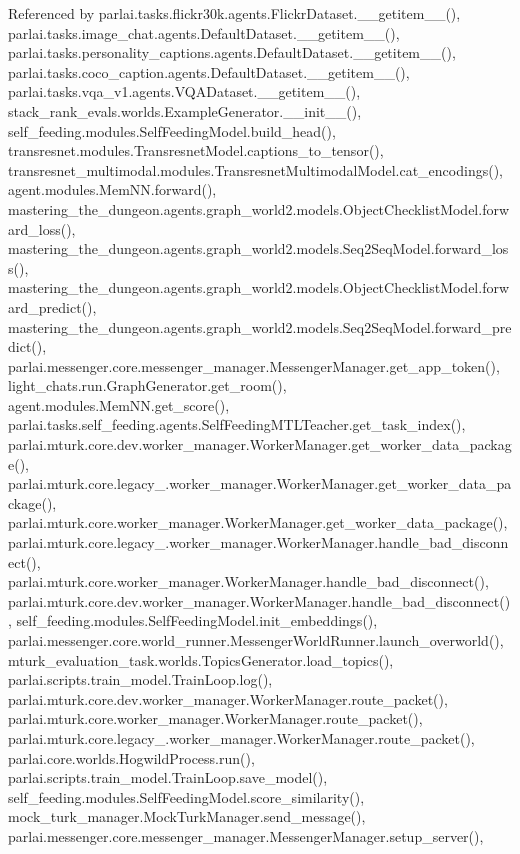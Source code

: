 Referenced by parlai.\+tasks.\+flickr30k.\+agents.\+Flickr\+Dataset.\+\_\+\+\_\+getitem\+\_\+\+\_\+(), parlai.\+tasks.\+image\+\_\+chat.\+agents.\+Default\+Dataset.\+\_\+\+\_\+getitem\+\_\+\+\_\+(), parlai.\+tasks.\+personality\+\_\+captions.\+agents.\+Default\+Dataset.\+\_\+\+\_\+getitem\+\_\+\+\_\+(), parlai.\+tasks.\+coco\+\_\+caption.\+agents.\+Default\+Dataset.\+\_\+\+\_\+getitem\+\_\+\+\_\+(), parlai.\+tasks.\+vqa\+\_\+v1.\+agents.\+V\+Q\+A\+Dataset.\+\_\+\+\_\+getitem\+\_\+\+\_\+(), stack\+\_\+rank\+\_\+evals.\+worlds.\+Example\+Generator.\+\_\+\+\_\+init\+\_\+\+\_\+(), self\+\_\+feeding.\+modules.\+Self\+Feeding\+Model.\+build\+\_\+head(), transresnet.\+modules.\+Transresnet\+Model.\+captions\+\_\+to\+\_\+tensor(), transresnet\+\_\+multimodal.\+modules.\+Transresnet\+Multimodal\+Model.\+cat\+\_\+encodings(), agent.\+modules.\+Mem\+N\+N.\+forward(), mastering\+\_\+the\+\_\+dungeon.\+agents.\+graph\+\_\+world2.\+models.\+Object\+Checklist\+Model.\+forward\+\_\+loss(), mastering\+\_\+the\+\_\+dungeon.\+agents.\+graph\+\_\+world2.\+models.\+Seq2\+Seq\+Model.\+forward\+\_\+loss(), mastering\+\_\+the\+\_\+dungeon.\+agents.\+graph\+\_\+world2.\+models.\+Object\+Checklist\+Model.\+forward\+\_\+predict(), mastering\+\_\+the\+\_\+dungeon.\+agents.\+graph\+\_\+world2.\+models.\+Seq2\+Seq\+Model.\+forward\+\_\+predict(), parlai.\+messenger.\+core.\+messenger\+\_\+manager.\+Messenger\+Manager.\+get\+\_\+app\+\_\+token(), light\+\_\+chats.\+run.\+Graph\+Generator.\+get\+\_\+room(), agent.\+modules.\+Mem\+N\+N.\+get\+\_\+score(), parlai.\+tasks.\+self\+\_\+feeding.\+agents.\+Self\+Feeding\+M\+T\+L\+Teacher.\+get\+\_\+task\+\_\+index(), parlai.\+mturk.\+core.\+dev.\+worker\+\_\+manager.\+Worker\+Manager.\+get\+\_\+worker\+\_\+data\+\_\+package(), parlai.\+mturk.\+core.\+legacy\+\_.\+worker\+\_\+manager.\+Worker\+Manager.\+get\+\_\+worker\+\_\+data\+\_\+package(), parlai.\+mturk.\+core.\+worker\+\_\+manager.\+Worker\+Manager.\+get\+\_\+worker\+\_\+data\+\_\+package(), parlai.\+mturk.\+core.\+legacy\+\_.\+worker\+\_\+manager.\+Worker\+Manager.\+handle\+\_\+bad\+\_\+disconnect(), parlai.\+mturk.\+core.\+worker\+\_\+manager.\+Worker\+Manager.\+handle\+\_\+bad\+\_\+disconnect(), parlai.\+mturk.\+core.\+dev.\+worker\+\_\+manager.\+Worker\+Manager.\+handle\+\_\+bad\+\_\+disconnect(), self\+\_\+feeding.\+modules.\+Self\+Feeding\+Model.\+init\+\_\+embeddings(), parlai.\+messenger.\+core.\+world\+\_\+runner.\+Messenger\+World\+Runner.\+launch\+\_\+overworld(), mturk\+\_\+evaluation\+\_\+task.\+worlds.\+Topics\+Generator.\+load\+\_\+topics(), parlai.\+scripts.\+train\+\_\+model.\+Train\+Loop.\+log(), parlai.\+mturk.\+core.\+dev.\+worker\+\_\+manager.\+Worker\+Manager.\+route\+\_\+packet(), parlai.\+mturk.\+core.\+worker\+\_\+manager.\+Worker\+Manager.\+route\+\_\+packet(), parlai.\+mturk.\+core.\+legacy\+\_.\+worker\+\_\+manager.\+Worker\+Manager.\+route\+\_\+packet(), parlai.\+core.\+worlds.\+Hogwild\+Process.\+run(), parlai.\+scripts.\+train\+\_\+model.\+Train\+Loop.\+save\+\_\+model(), self\+\_\+feeding.\+modules.\+Self\+Feeding\+Model.\+score\+\_\+similarity(), mock\+\_\+turk\+\_\+manager.\+Mock\+Turk\+Manager.\+send\+\_\+message(), parlai.\+messenger.\+core.\+messenger\+\_\+manager.\+Messenger\+Manager.\+setup\+\_\+server(), 